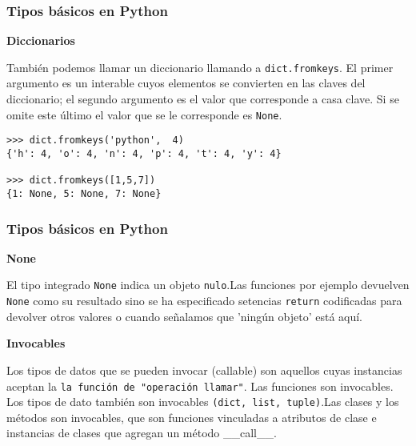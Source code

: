 \documentclass[10pt]{beamer}
\begin{document}
\begin{frame}[fragile]
\frametitle{Tipos b\'asicos en Python}

\textbf{Diccionarios}

\vspace{0.2cm}

Tambi\'en podemos llamar un diccionario llamando a \texttt{dict.fromkeys}. El primer argumento es un interable cuyos elementos se convierten en las claves del diccionario; el segundo argumento es el valor que corresponde a casa clave. Si se omite este \'ultimo el valor que se le corresponde es \texttt{None}.

\vspace{0.2cm}

\begin{lstlisting}
>>> dict.fromkeys('python',  4)
{'h': 4, 'o': 4, 'n': 4, 'p': 4, 't': 4, 'y': 4}

>>> dict.fromkeys([1,5,7])
{1: None, 5: None, 7: None}
\end{lstlisting}
\end{frame}

\begin{frame}[fragile]
\frametitle{Tipos b\'asicos en Python}

\textbf{None}

\vspace{0.2cm}

El tipo integrado \texttt{None} indica un objeto \texttt{nulo}.Las funciones por ejemplo devuelven \texttt{None} como su resultado sino se ha especificado setencias \texttt{return} codificadas para devolver otros valores o cuando se\~nalamos que 'ning\'un objeto' est\'a aqu\'i.

\vspace{0.3cm}

\textbf{Invocables}

\vspace{0.2cm}

Los tipos de datos que se pueden invocar (callable) son aquellos cuyas instancias aceptan la \texttt{la funci\'on de "operaci\'on llamar"}. Las funciones son invocables. Los tipos de dato tambi\'en son invocables \texttt{(dict, list, tuple)}.Las clases y los m\'etodos son invocables, que son funciones vinculadas a atributos de clase e instancias de clases que agregan un m\'etodo \_\_call\_\_.
\vspace{0.2cm}

\end{frame}
\end{document}
